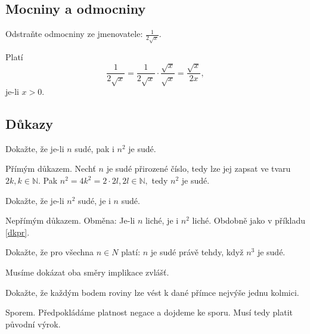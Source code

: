 \subsection{Mocniny a odmocniny}
\begin{priklad}
Odstraňte odmocniny ze jmenovatele: $\frac{1}{2 \sqrt{x} }.$
\end{priklad}

\begin{reseni}
Platí
$$\frac{1}{2\sqrt{x} }=\frac{1}{2\sqrt{x} }\cdot \frac{\sqrt{x} }{\sqrt{x} }=\frac{\sqrt{x} }{2x},$$
je-li $x>0.$
\end{reseni}

\subsection{Důkazy}
\begin{priklad}
Dokažte, že je-li $n$ sudé, pak i $n^2$ je sudé.
\end{priklad}

\begin{reseni}\label{dkpr}
Přímým důkazem. Nechť $n$ je sudé přirozené číslo, tedy lze jej zapsat ve tvaru $2k, k \in \mathbb N.$
Pak $n^2 = 4k^2 = 2\cdot 2l, 2l\in \mathbb N, $ tedy $n^2$ je sudé.
\end{reseni}

\begin{priklad}
Dokažte, že je-li $n^2$ sudé, je i $n$ sudé.
\end{priklad}

\begin{reseni}
Nepřímým důkazem. Obměna: Je-li $n$ liché, je i $n^2$ liché. Obdobně jako v příkladu \ref{dkpr}.
\end{reseni}

\begin{priklad}
Dokažte, že pro všechna $n\in N$ platí: $n$ je sudé právě tehdy, když $n^3$ je sudé.
\end{priklad}

\begin{reseni}
Musíme dokázat oba směry implikace zvlášť.
\end{reseni}

\begin{priklad}
Dokažte, že každým bodem roviny lze vést k dané přímce nejvýše jednu kolmici.
\end{priklad}

\begin{reseni}
Sporem. Předpokládáme platnost negace a dojdeme ke sporu. Musí tedy platit původní výrok.
\end{reseni}

